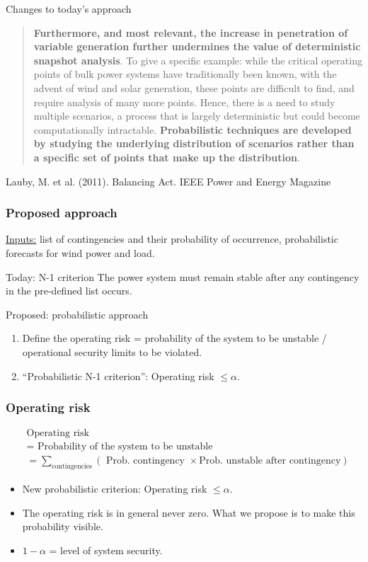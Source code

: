 \documentclass{beamer}
\begin{document}
\begin{frame}{Changes to today's approach}
\small{
\begin{quote}
  \textbf{Furthermore, and most relevant, the increase in penetration of variable generation further undermines the value of deterministic snapshot analysis}. To give a specific example: while the critical operating points of bulk power systems have traditionally been known, with the advent of wind and solar generation, these points are difficult to find, and require analysis of many more points. Hence, there is a need to study multiple scenarios, a process that is largely deterministic but could become computationally intractable. \textbf{Probabilistic techniques are developed by studying the underlying distribution of scenarios rather than a specific set of points that make up the distribution}.
\end{quote}
Lauby, M. et al. (2011). Balancing Act. IEEE Power and Energy Magazine}
\end{frame}

\begin{frame}
  \frametitle{Proposed approach}
\underline{Inputs:} list of contingencies and their probability of occurrence, probabilistic forecasts for wind power and load.

\begin{block}{Today: N-1 criterion}
The power system must remain stable after any contingency in the pre-defined list occurs.
\end{block}

\begin{block}{Proposed: probabilistic approach}
  \begin{enumerate}
  \item Define the operating risk = probability of the system to be unstable / operational security limits to be violated.
  \item ``Probabilistic N-1 criterion'': Operating risk $\leq \alpha$.
  \end{enumerate}
\end{block}
\end{frame}

\begin{frame}
  \frametitle{Operating risk}
  \begin{align*}
& \text{Operating risk } \\
&= \text{ Probability of the system to be unstable} \\
 &= \sum_{\text{contingencies}} \left( \text{ Prob. contingency } \times \text{Prob. unstable after contingency} \right)
  \end{align*}
\begin{itemize}
\item New probabilistic criterion: Operating risk $\leq \alpha$.
\item The operating risk is in general never zero. What we propose is to make this probability visible.
\item $1-\alpha$ = level of system security.
\end{itemize}    
\end{frame}
\end{document}
